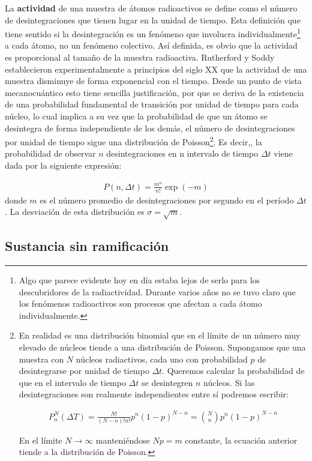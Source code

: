 La \textbf{actividad} de una muestra de átomos radioactivos se define como el número de desintegraciones que tienen lugar en la unidad de tiempo. Esta definición que tiene sentido si la desintegración es un fenómeno que involucra individualmente\footnote{Algo que parece evidente hoy en día estaba lejos de serlo para los descubridores de la radiactividad. Durante varios años no se tuvo claro que los fenómenos radioactivos son procesos que afectan a cada átomo individualmente.} a cada átomo, no un fenómeno colectivo. Así definida, es obvio que la actividad es proporcional al tamaño de la muestra radioactiva. Rutherford y Soddy establecieron experimentalmente a principios del siglo XX que la actividad de una muestra disminuye de forma exponencial con el tiempo. Desde un punto de vista mecanocuántico esto tiene sencilla justificación, por que se deriva de la existencia de una probabilidad fundamental de transición por unidad de tiempo para cada núcleo, lo cual implica a su vez que la probabilidad de que un átomo se desintegra de forma independiente de los demás, el número de desintegraciones por unidad de tiempo sigue una distribución de Poisson\footnote{En realidad es una distribución binomial que en el límite de un número muy elevado de núcleos tiende a una distribución de Poisson. Supongamos que una muestra con $N$ núcleos radiactivos, cada uno con probabilidad $p$ de desintegrarse por unidad de tiempo $\Delta t$. Queremos calcular la probabilidad de que en el intervalo de tiempo $\Delta t$ se desintegren $n$ núcleos. Si las desintegraciones son realmente independientes entre sí podremos escribir:

\begin{eqnarray}
	P_n^N (\Delta T) = \frac{N!}{(N-n)!n!} p^n (1-p)^{N-n} = \binom{N}{n} p^n (1-p)^{N-n}
\end{eqnarray}

En el límite $N\rightarrow \infty$ manteniéndose $Np=m$ constante, la ecuación anterior tiende a la distribución de Poisson.}. Es decir,, la probabilidad de observar $n$ desintegraciones en n intervalo de tiempo $\Delta t$ viene dada por la siguiente expresión:

\begin{eqnarray}
	P(n,\Delta t) = \frac{m^n}{n!} \exp (-m)
\end{eqnarray}
donde $m$ es el número promedio de desintegraciones por segundo en el período $\Delta t$. La desviación de esta distribución es $\sigma = \sqrt{m}$.



\subsection{Sustancia sin ramificación} \label{Subsec:02-04-01}

